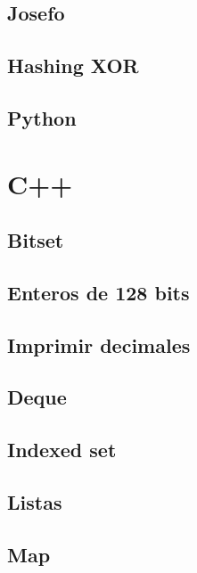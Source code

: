 \subsection{Josefo}
\raggedbottom
\hrulefill
\subsection{Hashing XOR}
\raggedbottom
\hrulefill
\subsection{Python}
\raggedbottom
\hrulefill

\section{C++}
\subsection{Bitset}
\raggedbottom
\hrulefill
\subsection{Enteros de 128 bits}
\raggedbottom
\hrulefill
\subsection{Imprimir decimales}
\raggedbottom
\hrulefill
\subsection{Deque}
\raggedbottom
\hrulefill
\subsection{Indexed set}
\raggedbottom
\hrulefill
\subsection{Listas}
\raggedbottom
\hrulefill
\subsection{Map}
\raggedbottom
\hrulefill
